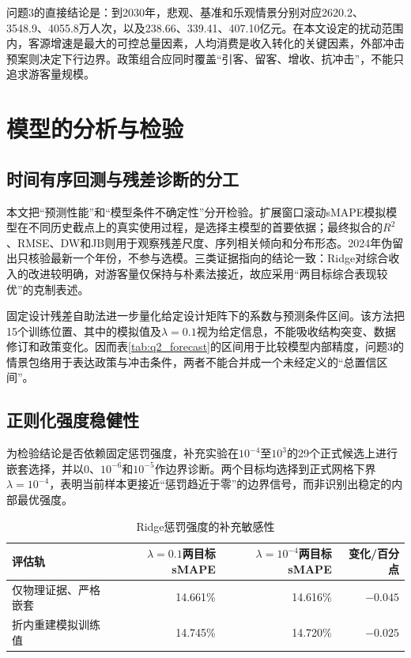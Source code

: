 \documentclass[withoutpreface,bwprint]{cumcmthesis}
\begin{document}
问题3的直接结论是：到2030年，悲观、基准和乐观情景分别对应2620.2、3548.9、4055.8万人次，以及238.66、339.41、407.10亿元。在本文设定的扰动范围内，客源增速是最大的可控总量因素，人均消费是收入转化的关键因素，外部冲击预案则决定下行边界。政策组合应同时覆盖“引客、留客、增收、抗冲击”，不能只追求游客量规模。


\section{模型的分析与检验}

\subsection{时间有序回测与残差诊断的分工}

本文把“预测性能”和“模型条件不确定性”分开检验。扩展窗口滚动sMAPE模拟模型在不同历史截点上的真实使用过程，是选择主模型的首要依据；最终拟合的$R^2$、RMSE、DW和JB则用于观察残差尺度、序列相关倾向和分布形态。2024年伪留出只核验最新一个年份，不参与选模。三类证据指向的结论一致：Ridge对综合收入的改进较明确，对游客量仅保持与朴素法接近，故应采用“两目标综合表现较优”的克制表述。

固定设计残差自助法进一步量化给定设计矩阵下的系数与预测条件区间。该方法把15个训练位置、其中的模拟值及$\lambda=0.1$视为给定信息，不能吸收结构突变、数据修订和政策变化。因而表\ref{tab:q2_forecast}的区间用于比较模型内部精度，问题3的情景包络用于表达政策与冲击条件，两者不能合并成一个未经定义的“总置信区间”。

\subsection{正则化强度稳健性}

为检验结论是否依赖固定惩罚强度，补充实验在$10^{-4}$至$10^3$的29个正式候选上进行嵌套选择，并以0、$10^{-6}$和$10^{-5}$作边界诊断。两个目标均选择到正式网格下界$\lambda=10^{-4}$，表明当前样本更接近“惩罚趋近于零”的边界信号，而非识别出稳定的内部最优强度。

\begin{table}[H]
\centering
\caption{Ridge惩罚强度的补充敏感性}
\label{tab:ridge_lambda_sensitivity}
\small
\renewcommand{\arraystretch}{1.10}
\begin{tabularx}{\textwidth}{Xrrr}
\toprule
评估轨 & $\lambda=0.1$两目标sMAPE & $\lambda=10^{-4}$两目标sMAPE & 变化/百分点 \\
\midrule
仅物理证据、严格嵌套 & 14.661\% & 14.616\% & $-0.045$ \\
折内重建模拟训练值 & 14.745\% & 14.720\% & $-0.025$ \\
\bottomrule
\end{tabularx}
\end{table}
\end{document}
